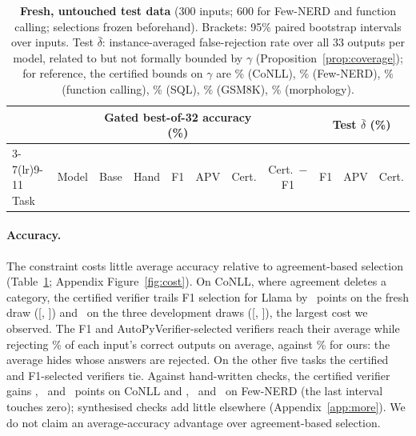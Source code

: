 \documentclass[11pt]{article}
\begin{document}
\begin{table}[t]\centering\footnotesize
\setlength{\tabcolsep}{3.6pt}
\begin{tabular}{@{}llccccccccc@{}}
\toprule
& & \multicolumn{5}{c}{Gated best-of-32 accuracy (\%)} & & \multicolumn{3}{c}{Test $\bar\delta$ (\%)} \\
\cmidrule(lr){3-7}\cmidrule(lr){9-11}
Task & Model & Base & Hand & F1 & APV & Cert. & Cert.\ $-$ F1 & F1 & APV & Cert. \\
\midrule

\bottomrule
\end{tabular}
\caption{\textbf{Fresh, untouched test data} (300 inputs; 600 for Few-NERD
and function calling; selections frozen beforehand). Brackets: 95\% paired
bootstrap intervals over inputs. Test $\bar\delta$: instance-averaged
false-rejection rate over all 33 outputs per model, related to but not
formally bounded by $\gamma$ (Proposition~\ref{prop:coverage}); for
reference, the certified bounds on $\gamma$ are \boundBIE\% (CoNLL), \boundBFewnerd\% (Few-NERD), \boundBFC\% (function
calling), \boundBSQL\% (SQL), \boundBMath\% (GSM8K), \boundBMorph\%
(morphology).}
\label{tab:fresh}
\end{table}

\paragraph{Accuracy.} The constraint costs little average accuracy
relative to agreement-based selection (Table~\ref{tab:fresh};
Appendix Figure~\ref{fig:cost}). On CoNLL, where agreement deletes a
category, the certified verifier trails F1 selection for Llama by
\frVsFoneIELlama\ points on the fresh draw ([\frVsFoneLoIELlama,
\frVsFoneHiIELlama]) and \devVsFoneIELlama\ on the three development draws
([\devVsFoneLoIELlama, \devVsFoneHiIELlama]), the largest cost we
observed. The F1 and
AutoPyVerifier-selected verifiers reach their average while rejecting
\frDltFoneIELlama\% of each input's correct outputs on average, against \frDltCertIELlama\% for ours: the average hides whose
answers are rejected. On the other five tasks the certified and F1-selected
verifiers tie. Against hand-written checks, the certified verifier gains
\frGainIELlama, \frGainIEMini\ and \frGainIEQwen\ points on CoNLL and
\frGainFewnerdLlama, \frGainFewnerdMini\ and \frGainFewnerdQwen\ on Few-NERD
(the last interval touches zero); synthesised checks add little elsewhere
(Appendix~\ref{app:more}). We do not claim an average-accuracy advantage
over agreement-based selection.
\end{document}
